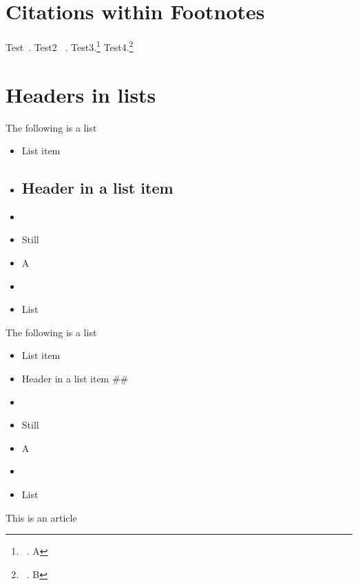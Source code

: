 \part{Citations within Footnotes}
\label{citationswithinfootnotes}

Test~\citep{Citekey;}. Test2 ~\citep{Citekey;}. Test3.\footnote{~\citep{Citekey;}. A} Test4.\footnote{~\citep{Citekey;}. B}

\part{Headers in lists}
\label{headersinlists}

The following is a list

\begin{itemize}
\item List item

\item \chapter{Header in a list item}
\label{headerinalistitem}

\item 

\item Still

\item A 

\item 

\item List

\end{itemize}

The following is a list

\begin{itemize}
\item List item

\item Header in a list item \#\#

\item 

\item Still

\item A 

\item 

\item List

\end{itemize}

\begin{thebibliography}{0}

This is an article




\end{thebibliography}




